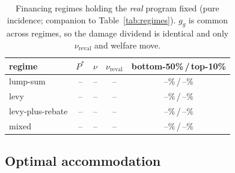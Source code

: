 \documentclass[12pt]{article}
\providecommand{\pendingnum}{\textit{--}}
\providecommand{\RDefRealP}{\pendingnum}\providecommand{\RLevRealP}{\pendingnum}
\providecommand{\RRebRealP}{\pendingnum}\providecommand{\RMixRealP}{\pendingnum}
\providecommand{\RDefRealRev}{\pendingnum}\providecommand{\RLevRealRev}{\pendingnum}
\providecommand{\RRebRealRev}{\pendingnum}\providecommand{\RMixRealRev}{\pendingnum}
\providecommand{\RDefRealNu}{\pendingnum}\providecommand{\RLevRealNu}{\pendingnum}
\providecommand{\RRebRealNu}{\pendingnum}\providecommand{\RMixRealNu}{\pendingnum}
\providecommand{\RDefRealBfifty}{\pendingnum}\providecommand{\RLevRealBfifty}{\pendingnum}
\providecommand{\RRebRealBfifty}{\pendingnum}\providecommand{\RMixRealBfifty}{\pendingnum}
\providecommand{\RDefRealTten}{\pendingnum}\providecommand{\RLevRealTten}{\pendingnum}
\providecommand{\RRebRealTten}{\pendingnum}\providecommand{\RMixRealTten}{\pendingnum}
\begin{document}
\begin{table}[!htb]
\centering
\caption{Financing regimes holding the \emph{real} program fixed (pure
incidence; companion to Table~\ref{tab:regimes}). $g_g$ is common across
regimes, so the damage dividend is identical and only $\nu_{\mathrm{reval}}$ and
welfare move.}
\label{tab:regimesreal}
\begin{tabular}{lcccc}
\toprule
regime & $P^{*}$ & $\nu$ & $\nu_{\mathrm{reval}}$ & bottom-50\%\,/\,top-10\% \\
\midrule
lump-sum         & $\RDefRealP$ & $\RDefRealNu$ & $\RDefRealRev$ & $\RDefRealBfifty\%$\,/\,$\RDefRealTten\%$ \\
levy       & $\RLevRealP$ & $\RLevRealNu$ & $\RLevRealRev$ & $\RLevRealBfifty\%$\,/\,$\RLevRealTten\%$ \\
levy-plus-rebate& $\RRebRealP$ & $\RRebRealNu$ & $\RRebRealRev$ & $\RRebRealBfifty\%$\,/\,$\RRebRealTten\%$ \\
mixed           & $\RMixRealP$ & $\RMixRealNu$ & $\RMixRealRev$ & $\RMixRealBfifty\%$\,/\,$\RMixRealTten\%$ \\
\bottomrule
\end{tabular}
\end{table}

\subsection{Optimal accommodation}\label{subsec:optmu}
\end{document}

